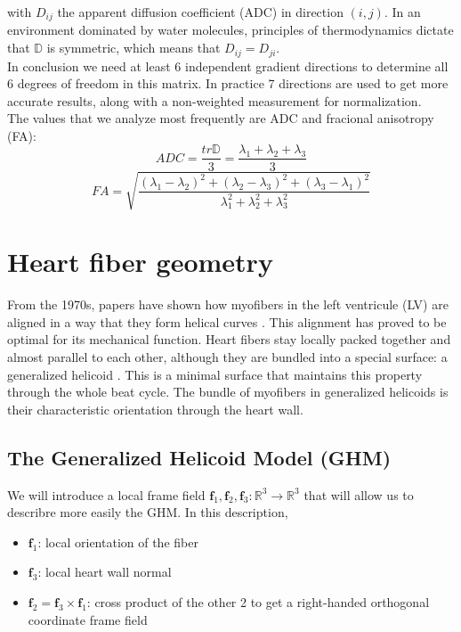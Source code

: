 with $D_{ij}$ the apparent diffusion coefficient (ADC) in direction $(i, j)$. In an environment dominated by water molecules, principles of thermodynamics dictate that $\mathbb{D}$ is symmetric, which means that $D_{ij} = D_{ji}$.\\
In conclusion we need at least 6 independent gradient directions to determine all 6 degrees of freedom in this matrix. In practice 7 directions are used to get more accurate results, along with a non-weighted measurement for normalization.\\
The values that we analyze most frequently are ADC and fracional anisotropy (FA):
\begin{equation}
    ADC = \frac{tr{\mathbb{D}}}{3} = \frac{\lambda_1 + \lambda_2 + \lambda_3}{3}
\end{equation}
\begin{equation}
    FA = \sqrt{\frac{(\lambda_1 - \lambda_2)^2 + (\lambda_2 - \lambda_3)^2 + (\lambda_3 - \lambda_1)^2}{\lambda_1^2 + \lambda_2^2 + \lambda_3^2}}
\end{equation}

\section{Heart fiber geometry}

From the 1970s, papers have shown how myofibers in the left ventricule (LV) are aligned in a way that they form helical curves \cite{savadjiev2012heart}. This alignment has proved to be optimal for its mechanical function. Heart fibers stay locally packed together and almost parallel to each other, although they are bundled into a special surface: a generalized helicoid \cite{blair1978generalization}. This is a minimal surface that maintains this property through the whole beat cycle. The bundle of myofibers in generalized helicoids is their characteristic orientation through the heart wall.

\subsection{The Generalized Helicoid Model (GHM)}

We will introduce a local frame field $\mathbf{f}_1,\mathbf{f}_2,\mathbf{f}_3 : \mathbb{R}^3 \to \mathbb{R}^3$ that will allow us to describre more easily the GHM. In this description,
\begin{itemize}
    \item $\mathbf{f}_1$: local orientation of the fiber
    \item $\mathbf{f}_3$: local heart wall normal
    \item $\mathbf{f}_2 = \mathbf{f}_3 \times \mathbf{f}_1$: cross product of the other 2 to get a right-handed orthogonal coordinate frame field
\end{itemize}

